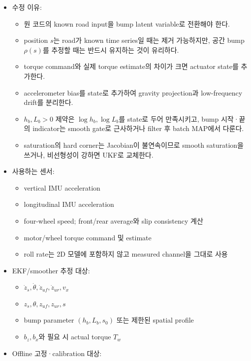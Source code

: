 \documentclass[letterpaper,10pt,journal,twocolumn]{ieeeconf}
\begin{document}
\begin{itemize}

\item
  수정 이유:

  \begin{itemize}
  
  \item
    원 코드의 known road input을 bump latent variable로 전환해야 한다.
  \item
    position \(s\)는 road가 known time series일 때는 제거 가능하지만, 공간 bump \(\rho(s)\)를 추정할 때는 반드시 유지하는 것이 유리하다.
  \item
    torque command와 실제 torque estimate의 차이가 크면 actuator state를 추가한다.
  \item
    accelerometer bias를 state로 추가하여 gravity projection과 low-frequency drift를 분리한다.
  \item
    \(h_b,L_b>0\) 제약은 \(\log h_b,\log L_b\)를 state로 두어 만족시키고, bump 시작·끝의 indicator는 smooth gate로 근사하거나 filter 후 batch MAP에서 다룬다.
  \item
    saturation의 hard corner는 Jacobian이 불연속이므로 smooth saturation을 쓰거나, 비선형성이 강하면 UKF로 교체한다.
  \end{itemize}
\item
  사용하는 센서:

  \begin{itemize}
  
  \item
    vertical IMU acceleration
  \item
    longitudinal IMU acceleration
  \item
    four-wheel speed; front/rear average와 slip consistency 계산
  \item
    motor/wheel torque command 및 estimate
  \item
    roll rate는 2D 모델에 포함하지 않고 measured channel을 그대로 사용
  \end{itemize}
\item
  EKF/smoother 추정 대상:

  \begin{itemize}
  
  \item
    \(\dot z_s,\dot\theta,\dot z_{uf},\dot z_{ur},v_x\)
  \item
    \(z_s,\theta,z_{uf},z_{ur},s\)
  \item
    bump parameter \((h_b,L_b,s_0)\) 또는 제한된 spatial profile
  \item
    \(b_z,b_x\)와 필요 시 actual torque \(T_w\)
  \end{itemize}
\item
  Offline 고정·calibration 대상:


\end{itemize}
\end{document}
